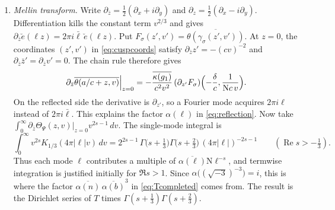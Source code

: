 \documentclass[11pt]{article}
\numberwithin{equation}{section}
\newcommand{\N}{\mathrm N}
\theoremstyle{definition}
\theoremstyle{remark}
\begin{document}
\begin{enumerate}
To track the multiplier uniformly as the twist varies, the paper refines these choices by fixed
congruences at the primes above $2$ and $3$ \cite[App.~A.2]{QRH}. With those choices, cubic reciprocity gives
$\kappa(g_1)=\kappa_0\prod_{p\mid c,\ p\nmid6}\chi_p(a)^2$, where $\kappa_0$ depends only on fixed
congruence data; the primes $p\nmid6$ occur to the first power in the reduced denominator $c$.
Finally, \eqref{eq:H3action} gives
\begin{equation}\label{eq:cuspcoords}
 g^{-1}\Bigl(\frac ac+z,v\Bigr)=\Bigl(-\frac\delta c-\frac{\bar z}{c^2(v^2+|z|^2)},\ \frac v{\N c\,(v^2+|z|^2)}\Bigr).
\end{equation}
At $z=0$ this is $(-\delta/c,\,1/(\N c\,v))$: small $v$ becomes large $v$.
\item \emph{Mellin transform.} Write $\partial_{\bar z}=\tfrac12(\partial_x+i\partial_y)$ and
$\partial_z=\tfrac12(\partial_x-i\partial_y)$. Differentiation kills the constant term $v^{2/3}$ and gives
$\partial_{\bar z}\breve e(\ell z)=2\pi i\bar\ell\,\breve e(\ell z)$.
Put $F_\sigma(z',v')=\overline{\theta(\gamma_\sigma(z',v'))}$.
At $z=0$, the coordinates $(z',v')$ in \eqref{eq:cuspcoords} satisfy
$\partial_{\bar z}z'=-(cv)^{-2}$ and $\partial_{\bar z}\bar z'=\partial_{\bar z}v'=0$.
The chain rule therefore gives
\begin{equation}\label{eq:cuspderivative}
 \left.\partial_{\bar z}\overline{\theta(a/c+z,v)}\right|_{z=0}
 =-\frac{\overline{\kappa(g_1)}}{c^2v^2}\,
 (\partial_{z'}F_\sigma)\Bigl(-\frac\delta c,\frac1{\N c\,v}\Bigr).
\end{equation}
On the reflected side the derivative is $\partial_{z'}$, so a Fourier mode acquires $2\pi i\ell$
instead of $2\pi i\bar\ell$. This explains the factor $\alpha(\ell)$ in \eqref{eq:reflection}.
Now take $\int_0^\infty\left.\partial_{\bar z}\Theta_\Psi(z,v)\right|_{z=0}v^{2s-1}\,dv$.
The single-mode integral is
\begin{equation}\label{eq:besselmellin}
 \int_0^\infty v^{2s}K_{1/3}(4\pi|\ell|v)\,dv=2^{2s-1}\,\Gamma\bigl(s+\tfrac13\bigr)\Gamma\bigl(s+\tfrac23\bigr)\,(4\pi|\ell|)^{-2s-1}
 \qquad(\operatorname{Re}s>-\tfrac13).
\end{equation}
Thus each mode $\ell$ contributes a multiple of $\overline{\alpha(\ell)}\N\ell^{-s}$, and termwise integration
is justified initially for $\Re s>1$. Since $\alpha\bigl((\sqrt{-3})^{-3}\bigr)=i$,
this is where the factor $\overline{\alpha(n)}\,\overline{\alpha(b)}^3$ in \eqref{eq:Tcompleted} comes from. The
result is the Dirichlet series of $T$ times $\Gamma(s+\frac13)\Gamma(s+\frac23)$.

\end{enumerate}
\end{document}
